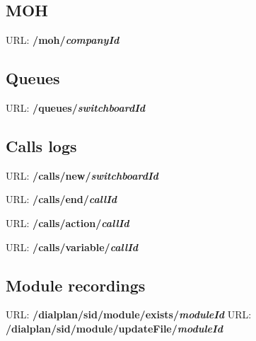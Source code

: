 \subsection{MOH}
URL: \textbf{/moh/{\textit{companyId}}}

\subsection{Queues}
URL: \textbf{/queues/{\textit{switchboardId}}}


\subsection{Calls logs}
URL: \textbf{/calls/new/{\textit{switchboardId}}}

URL: \textbf{/calls/end/{\textit{callId}}}

URL: \textbf{/calls/action/{\textit{callId}}}

URL: \textbf{/calls/variable/{\textit{callId}}}

\subsection{Module recordings}

URL: \textbf{/dialplan/{sid}/module/exists/{\textit{moduleId}}}
URL: \textbf{/dialplan/{sid}/module/updateFile/{\textit{moduleId}}}




